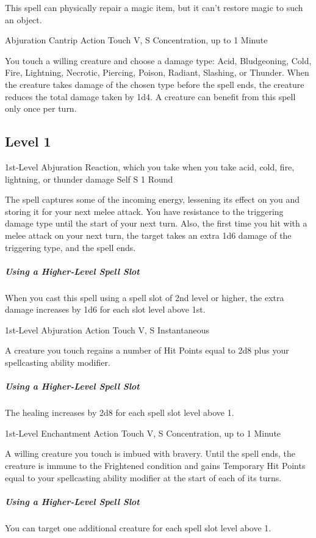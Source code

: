 \documentclass[letterpaper,openany,oneside,twocolumn]{book}
\begin{document}
This spell can physically repair a magic item, but it can't restore magic to such an object.

	{Abjuration Cantrip}
	{Action}
	{Touch}
	{V, S}
	{Concentration, up to 1 Minute}

You touch a willing creature and choose a damage type: Acid, Bludgeoning, Cold, Fire, Lightning, Necrotic, Piercing, Poison, Radiant, Slashing, or Thunder. When the creature takes damage of the chosen type before the spell ends, the creature reduces the total damage taken by 1d4. A creature can benefit from this spell only once per turn.

\subsection*{Level 1}

	{1st-Level Abjuration}
	{Reaction, which you take when you take acid, cold, fire, lightning, or thunder damage}
	{Self}
	{S}
	{1 Round}

The spell captures some of the incoming energy, lessening its effect on you and storing it for your next melee attack. You have resistance to the triggering damage type until the start of your next turn. Also, the first time you hit with a melee attack on your next turn, the target takes an extra 1d6 damage of the triggering type, and the spell ends.

\subparagraph*{Using a Higher-Level Spell Slot} When you cast this spell using a spell slot of 2nd level or higher, the extra damage increases by 1d6 for each slot level above 1st.

	{1st-Level Abjuration}
	{Action}
	{Touch}
	{V, S}
	{Instantaneous}

A creature you touch regains a number of Hit Points equal to 2d8 plus your spellcasting ability modifier.

\subparagraph*{Using a Higher-Level Spell Slot} The healing increases by 2d8 for each spell slot level above 1.

	{1st-Level Enchantment}
	{Action}
	{Touch}
	{V, S}
	{Concentration, up to 1 Minute}

A willing creature you touch is imbued with bravery. Until the spell ends, the creature is immune to the Frightened condition and gains Temporary Hit Points equal to your spellcasting ability modifier at the start of each of its turns.

\subparagraph*{Using a Higher-Level Spell Slot} You can target one additional creature for each spell slot level above 1.
\end{document}
